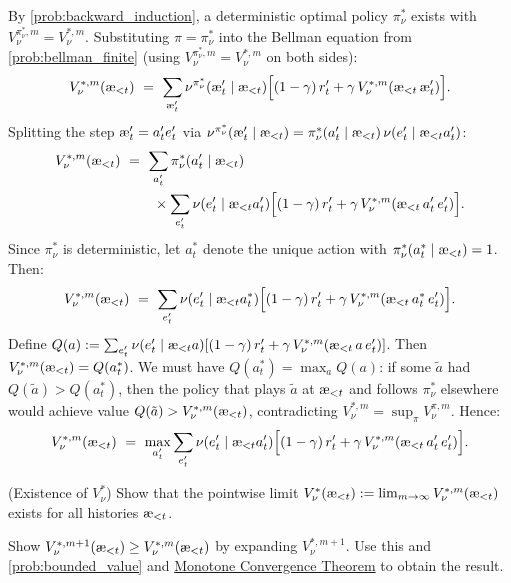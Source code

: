\documentclass[fontsize=11pt, parskip=half]{scrartcl}
\newcommand{\aes}{\textnormal{\ae}}
\begin{document}
\begin{solution}
By \cref{prob:backward_induction}, a deterministic optimal policy $\pi^*_\nu$ exists with $V_\nu^{\pi^*_\nu,m} = V_\nu^{*,m}$.
Substituting $\pi = \pi^*_\nu$ into the Bellman equation from \cref{prob:bellman_finite} (using $V_\nu^{\pi^*_\nu,m} = V_\nu^{*,m}$ on both sides):
\[
    V_\nu^{*,m}(\aes_{<t})
    ~=~ \sum_{\aes'_t} \nu^{\pi^*_\nu}(\aes'_t \mid \aes_{<t}) \Big[(1-\gamma)\, r'_t + \gamma\, V_\nu^{*,m}(\aes_{<t}\, \aes'_t)\Big].
\]
Splitting the step $\aes'_t = a'_t e'_t$ via $\nu^{\pi^*_\nu}(\aes'_t \mid \aes_{<t}) = \pi^*_\nu(a'_t \mid \aes_{<t})\, \nu(e'_t \mid \aes_{<t} a'_t)$:
\begin{align*}
    V_\nu^{*,m}(\aes_{<t})
    ~&=~ \sum_{a'_t} \pi^*_\nu(a'_t \mid \aes_{<t}) \\
    &\qquad \times \sum_{e'_t} \nu(e'_t \mid \aes_{<t} a'_t) \Big[(1-\gamma)\, r'_t + \gamma\, V_\nu^{*,m}(\aes_{<t}\, a'_t\, e'_t)\Big].
\end{align*}
Since $\pi^*_\nu$ is deterministic, let $a^*_t$ denote the unique action with $\pi^*_\nu(a^*_t \mid \aes_{<t}) = 1$. Then:
\[
    V_\nu^{*,m}(\aes_{<t})
    ~=~ \sum_{e'_t} \nu(e'_t \mid \aes_{<t} a^*_t) \Big[(1-\gamma)\, r'_t + \gamma\, V_\nu^{*,m}(\aes_{<t}\, a^*_t\, e'_t)\Big].
\]
Define $Q(a) := \sum_{e'_t} \nu(e'_t \mid \aes_{<t} a) [(1-\gamma)\, r'_t + \gamma\, V_\nu^{*,m}(\aes_{<t}\, a\, e'_t)]$.
Then $V_\nu^{*,m}(\aes_{<t}) = Q(a^*_t)$.
We must have $Q(a^*_t) = \max_{a} Q(a)$: if some $\tilde{a}$ had $Q(\tilde{a}) > Q(a^*_t)$, then the policy that plays $\tilde{a}$ at $\aes_{<t}$ and follows $\pi^*_\nu$ elsewhere would achieve value $Q(\tilde{a}) > V_\nu^{*,m}(\aes_{<t})$, contradicting $V_\nu^{*,m} = \sup_\pi V_\nu^{\pi,m}$.
Hence:
\[
    V_\nu^{*,m}(\aes_{<t})
    ~=~ \max_{a'_t} \sum_{e'_t} \nu(e'_t \mid \aes_{<t} a'_t) \Big[(1-\gamma)\, r'_t + \gamma\, V_\nu^{*,m}(\aes_{<t}\, a'_t\, e'_t)\Big].
\]
\end{solution}

\begin{exercise}
\label{prob:inf_horizon}
\skippable
(Existence of $V_\nu^*$)
Show that the pointwise limit $V_\nu^*(\aes_{<t}) := \lim_{m \to \infty} V_\nu^{*,m}(\aes_{<t})$ exists for all histories $\aes_{<t}$.


\begin{hint}
Show $V_\nu^{*,m+1}(\aes_{<t}) \geq V_\nu^{*,m}(\aes_{<t})$ by expanding $V_\nu^{*,m+1}$. Use this and \cref{prob:bounded_value}
and \href{https://en.wikipedia.org/wiki/Monotone_convergence_theorem}{Monotone Convergence Theorem} to obtain the result.
\end{hint}
\end{exercise}
\end{document}
